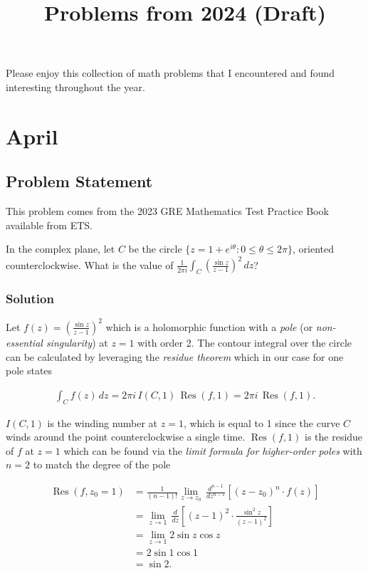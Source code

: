 \documentclass[12pt]{article}
\title{Problems from 2024 (Draft)}
\begin{document}
\maketitle

Please enjoy this collection of math problems that I encountered and found interesting throughout the year.

\setcounter{section}{3}
\section{April}

\subsection{Problem Statement}

This problem comes from the 2023 GRE Mathematics Test Practice Book available from ETS.

In the complex plane, let $C$ be the circle $\{ z = 1 + e^{i\theta} : 0 \le \theta \le 2\pi\}$, oriented counterclockwise. What is the value of $\frac{1}{2 \pi i} \int_{C} \left( \frac{\sin z}{z - 1} \right)^2\,dz$?

\subsubsection*{Solution}

Let $f(z) = \left( \frac{\sin z}{z - 1} \right)^2$ which is a holomorphic function with a {\em{pole}} (or {\em{non-essential singularity}}) at $z=1$ with order 2. The contour integral over the circle can be calculated by leveraging the {\em{residue theorem}} which in our case for one pole states

\begin{align}
  \int_{C} f(z)\, dz = 2 \pi i \, I(C,1) \, \operatorname{Res}(f,1) = 2 \pi i \, \operatorname{Res}(f,1).
\end{align}

$I(C,1)$ is the winding number at $z=1$, which is equal to 1 since the curve $C$ winds around the point counterclockwise a single time. $\operatorname{Res}(f,1)$ is the residue of $f$ at $z=1$ which can be found via the {\em{limit formula for higher-order poles}} with $n = 2$ to match the degree of the pole

\begin{align}
  \operatorname{Res}(f, z_0 = 1)
    &= \frac{1}{(n-1)!} \lim_{z \rightarrow z_0} \, \frac{d^{n-1}}{dz^{n-1}} \left[ \left(z - z_0\right)^n \cdot f(z) \right] \\
    &= \lim_{z \rightarrow 1} \, \frac{d}{dz} \left[ \left(z - 1\right)^2 \cdot \frac{\sin^2 z}{(z-1)^2} \right] \\
    &= \lim_{z \rightarrow 1} 2 \sin z \cos z \\
    &= 2 \sin 1 \cos 1 \\
    &= \sin 2.
\end{align}
\end{document}
